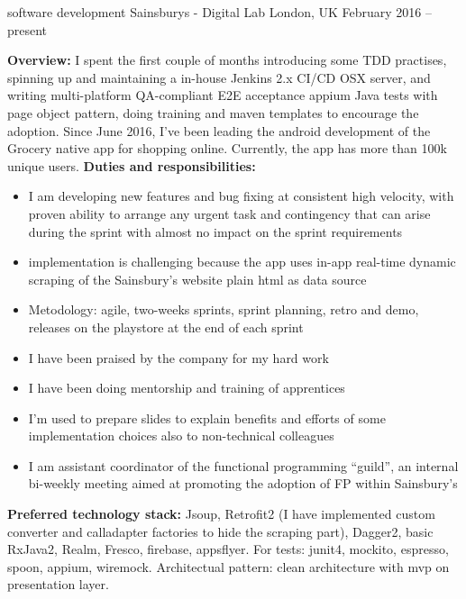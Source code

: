 \begin{cventries}
\cventry
{software development}
{Sainsburys - Digital Lab}
{London, UK}
{February 2016 -- present}
{%
\textbf{Overview:}
   I spent the first couple of months introducing some TDD practises,
   spinning up and maintaining a in-house Jenkins 2.x CI/CD
   OSX server, and writing multi-platform QA-compliant
   E2E acceptance appium Java tests with page object pattern, doing training  and maven templates to encourage the adoption. 
   Since June 2016, I've been leading the android development of the Grocery 
   native app for shopping online. Currently, the app has
    more than 100k unique users.
    \newline
\textbf{Duties and responsibilities:}
\begin{itemize}
\item 
I am developing new features and bug fixing at consistent high velocity, with proven ability to arrange any urgent task and contingency that can arise during the sprint with almost no impact on the sprint requirements
\item 
implementation is challenging because the app uses in-app real-time dynamic scraping
   of the Sainsbury's website plain html as data source
\item Metodology: agile, two-weeks sprints, sprint planning, retro and demo,  releases on the playstore at the end of each sprint
    \item 
    I have been praised by the company for my hard work
    \item 
    I have been doing mentorship and training of apprentices 
\item 
I'm used to prepare slides to explain benefits and efforts of some implementation choices also to non-technical colleagues
    \item I am assistant coordinator of the functional programming ``guild'', an internal bi-weekly meeting aimed at promoting the adoption of FP within Sainsbury's
\end{itemize}
    \textbf{Preferred technology stack:} Jsoup, Retrofit2 (I have implemented custom converter and calladapter factories to hide the scraping part), Dagger2, basic RxJava2,
    Realm,
   Fresco, firebase, appsflyer. For tests: junit4, mockito, espresso, spoon, appium, wiremock.
   Architectual pattern: clean architecture with mvp on presentation layer. 
\newline
}
\end{cventries}
